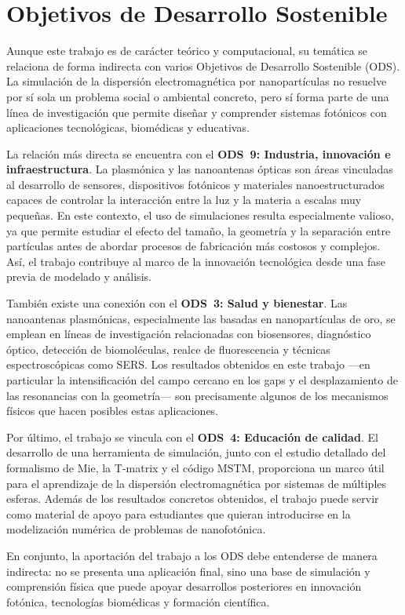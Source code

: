 \section{Objetivos de Desarrollo Sostenible}
\label{sec:ods}

Aunque este trabajo es de carácter teórico y computacional, su temática se
relaciona de forma indirecta con varios Objetivos de Desarrollo Sostenible
(ODS). La simulación de la dispersión electromagnética por nanopartículas no
resuelve por sí sola un problema social o ambiental concreto, pero sí forma
parte de una línea de investigación que permite diseñar y comprender sistemas
fotónicos con aplicaciones tecnológicas, biomédicas y educativas.

La relación más directa se encuentra con el \textbf{ODS~9: Industria,
innovación e infraestructura}. La plasmónica y las nanoantenas ópticas son
áreas vinculadas al desarrollo de sensores, dispositivos fotónicos y
materiales nanoestructurados capaces de controlar la interacción entre la luz
y la materia a escalas muy pequeñas. En este contexto, el uso de simulaciones
resulta especialmente valioso, ya que permite estudiar el efecto del tamaño,
la geometría y la separación entre partículas antes de abordar procesos de
fabricación más costosos y complejos. Así, el trabajo contribuye al marco de
la innovación tecnológica desde una fase previa de modelado y análisis.

También existe una conexión con el \textbf{ODS~3: Salud y bienestar}. Las
nanoantenas plasmónicas, especialmente las basadas en nanopartículas de oro,
se emplean en líneas de investigación relacionadas con biosensores,
diagnóstico óptico, detección de biomoléculas, realce de fluorescencia y
técnicas espectroscópicas como SERS. Los resultados obtenidos en este trabajo
—en particular la intensificación del campo cercano en los gaps y el
desplazamiento de las resonancias con la geometría— son precisamente algunos
de los mecanismos físicos que hacen posibles estas aplicaciones.

Por último, el trabajo se vincula con el \textbf{ODS~4: Educación de calidad}.
El desarrollo de una herramienta de simulación, junto con el estudio detallado
del formalismo de Mie, la T-matrix y el código MSTM, proporciona un marco útil
para el aprendizaje de la dispersión electromagnética por sistemas de
múltiples esferas. Además de los resultados concretos obtenidos, el trabajo
puede servir como material de apoyo para estudiantes que quieran introducirse
en la modelización numérica de problemas de nanofotónica.

En conjunto, la aportación del trabajo a los ODS debe entenderse de manera
indirecta: no se presenta una aplicación final, sino una base de simulación y
comprensión física que puede apoyar desarrollos posteriores en innovación
fotónica, tecnologías biomédicas y formación científica.
